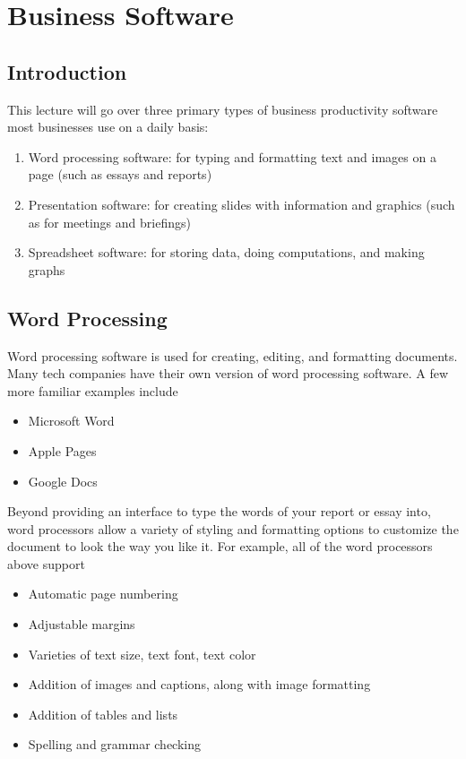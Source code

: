\chapter{Business Software}

\section{Introduction}

This lecture will go over three primary types of business productivity software most businesses use on a daily basis: 
\begin{enumerate}
	\item Word processing software: for typing and formatting text and images on a page (such as essays and reports) 
	\item Presentation software: for creating slides with information and graphics (such as for meetings and briefings)
	\item Spreadsheet software: for storing data, doing computations, and making graphs
\end{enumerate}

\section{Word Processing}

Word processing software is used for creating, editing, and formatting documents. Many tech companies have their own version of word processing software. A few more familiar examples include
\begin{itemize}
	\item Microsoft Word
	\item Apple Pages
	\item Google Docs
\end{itemize}

Beyond providing an interface to type the words of your report or essay into, word processors allow a variety of styling and formatting options to customize the document to look the way you like it. For example, all of the word processors above support
\begin{itemize}
	\item Automatic page numbering
	\item Adjustable margins
	\item Varieties of text size, text font, text color
	\item Addition of images and captions, along with image formatting
	\item Addition of tables and lists 
	\item Spelling and grammar checking
\end{itemize}

